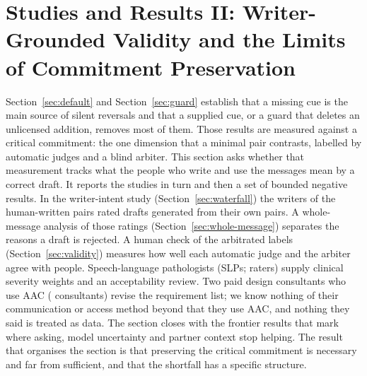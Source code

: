 \section{Studies and Results II: Writer-Grounded Validity and the Limits of Commitment Preservation}\label{sec:s4}

Section~\ref{sec:default} and Section~\ref{sec:guard} establish that a missing cue is the main source of silent reversals and that a supplied cue, or a guard that deletes an unlicensed addition, removes most of them.
Those results are measured against a critical commitment: the one dimension that a minimal pair contrasts, labelled by automatic judges and a blind arbiter.
This section asks whether that measurement tracks what the people who write and use the messages mean by a correct draft.
It reports the studies in turn and then a set of bounded negative results.
In the writer-intent study (Section~\ref{sec:waterfall}) the \jmpOneEightWriters{} writers of the human-written pairs rated drafts generated from their own pairs.
A whole-message analysis of those ratings (Section~\ref{sec:whole-message}) separates the reasons a draft is rejected.
A human check of the arbitrated labels (Section~\ref{sec:validity}) measures how well each automatic judge and the arbiter agree with people.
Speech-language pathologists (SLPs; \jmdesignSlp{} raters) supply clinical severity weights and an acceptability review.
Two paid design consultants who use AAC (\jmdesignConsultants{} consultants) revise the requirement list; we know nothing of their communication or access method beyond that they use AAC, and nothing they said is treated as data.
The section closes with the frontier results that mark where asking, model uncertainty and partner context stop helping.
The result that organises the section is that preserving the critical commitment is necessary and far from sufficient, and that the shortfall has a specific structure.

